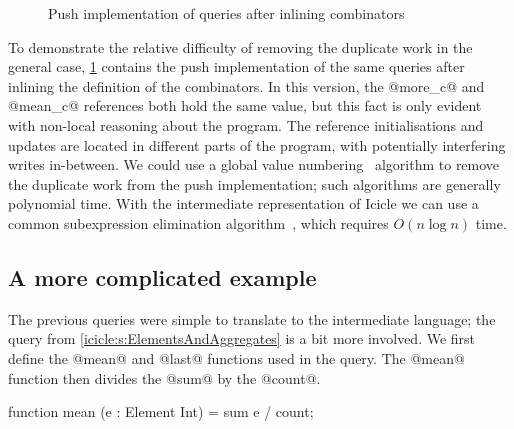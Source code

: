 \begin{figure}
\caption{Push implementation of queries after inlining combinators}
\label{icicle:fig:core:push_query}
\end{figure}

To demonstrate the relative difficulty of removing the duplicate work in the general case, \cref{icicle:fig:core:push_query} contains the push implementation of the same queries after inlining the definition of the combinators.
In this version, the @more_c@ and @mean_c@ references both hold the same value, but this fact is only evident with non-local reasoning about the program.
The reference initialisations and updates are located in different parts of the program, with potentially interfering writes in-between.
We could use a global value numbering~\citep{gulwani2004polynomial} algorithm to remove the duplicate work from the push implementation; such algorithms are generally polynomial time.
With the intermediate representation of Icicle we can use a common subexpression elimination algorithm~\cite{chitil1997common}, which requires $O(n \log n)$ time.

\subsection{A more complicated example}

The previous queries were simple to translate to the intermediate language; the query from \cref{icicle:s:ElementsAndAggregates} is a bit more involved.
We first define the @mean@ and @last@ functions used in the query.
The @mean@ function then divides the @sum@ by the @count@.
\begin{icicle}
function mean (e : Element Int)
 = sum e / count;
\end{icicle}

